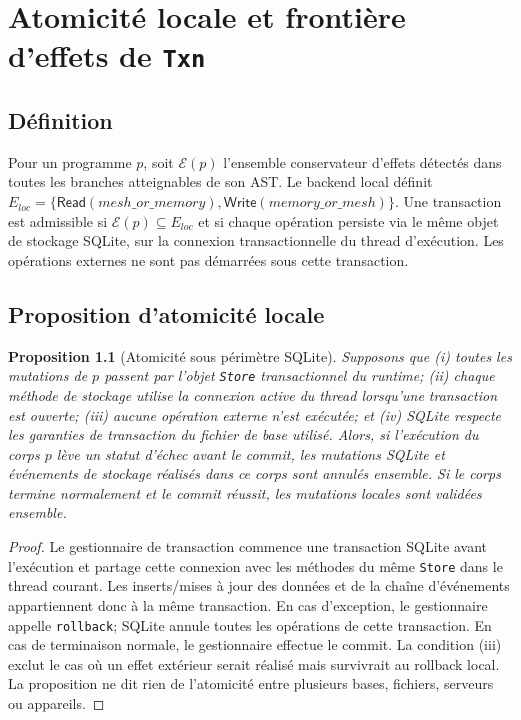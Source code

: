 \documentclass[11pt,a4paper,openany]{book}
\newcommand{\code}[1]{\texttt{#1}}
\newcommand{\Eff}{\mathcal{E}}
\theoremstyle{definition}
\theoremstyle{plain}
\newtheorem{proposition}[definition]{Proposition}
\theoremstyle{remark}
\begin{document}
\chapter{Atomicité locale et frontière d'effets de \code{Txn}}
\section{Définition}
Pour un programme $p$, soit $\Eff(p)$ l'ensemble conservateur d'effets détectés dans toutes les branches atteignables de son AST. Le backend local définit $E_{loc}=\{\mathsf{Read}(mesh\_or\_memory),\mathsf{Write}(memory\_or\_mesh)\}$. Une transaction est admissible si $\Eff(p)\subseteq E_{loc}$ et si chaque opération persiste via le même objet de stockage SQLite, sur la connexion transactionnelle du thread d'exécution. Les opérations externes ne sont pas démarrées sous cette transaction.

\section{Proposition d'atomicité locale}
\begin{proposition}[Atomicité sous périmètre SQLite]
Supposons que (i) toutes les mutations de $p$ passent par l'objet \code{Store} transactionnel du runtime; (ii) chaque méthode de stockage utilise la connexion active du thread lorsqu'une transaction est ouverte; (iii) aucune opération externe n'est exécutée; et (iv) SQLite respecte les garanties de transaction du fichier de base utilisé. Alors, si l'exécution du corps $p$ lève un statut d'échec avant le commit, les mutations SQLite et événements de stockage réalisés dans ce corps sont annulés ensemble. Si le corps termine normalement et le commit réussit, les mutations locales sont validées ensemble.
\end{proposition}
\begin{proof}
Le gestionnaire de transaction commence une transaction SQLite avant l'exécution et partage cette connexion avec les méthodes du même \code{Store} dans le thread courant. Les inserts/mises à jour des données et de la chaîne d'événements appartiennent donc à la même transaction. En cas d'exception, le gestionnaire appelle \code{rollback}; SQLite annule toutes les opérations de cette transaction. En cas de terminaison normale, le gestionnaire effectue le commit. La condition (iii) exclut le cas où un effet extérieur serait réalisé mais survivrait au rollback local. La proposition ne dit rien de l'atomicité entre plusieurs bases, fichiers, serveurs ou appareils.
\end{proof}
\end{document}
